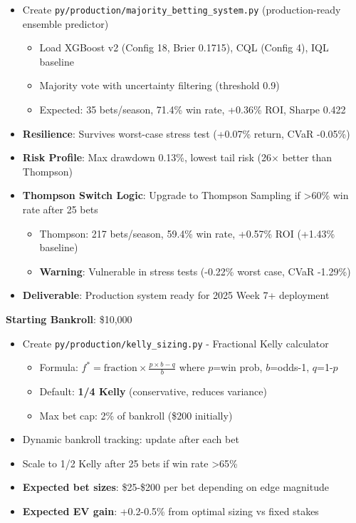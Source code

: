 \begin{itemize}
  \item {} Create \texttt{py/production/majority\_betting\_system.py} (production-ready ensemble predictor)
  \begin{itemize}
    \item Load XGBoost v2 (Config 18, Brier 0.1715), CQL (Config 4), IQL baseline
    \item Majority vote with uncertainty filtering (threshold 0.9)
    \item Expected: 35 bets/season, 71.4\% win rate, +0.36\% ROI, Sharpe 0.422
  \end{itemize}
  \item {} \textbf{Resilience}: Survives worst-case stress test (+0.07\% return, CVaR -0.05\%)
  \item {} \textbf{Risk Profile}: Max drawdown 0.13\%, lowest tail risk (26$\times$ better than Thompson)
  \item {} \textbf{Thompson Switch Logic}: Upgrade to Thompson Sampling if >60\% win rate after 25 bets
  \begin{itemize}
    \item Thompson: 217 bets/season, 59.4\% win rate, +0.57\% ROI (+1.43\% baseline)
    \item \textbf{Warning}: Vulnerable in stress tests (-0.22\% worst case, CVaR -1.29\%)
  \end{itemize}
  \item \textbf{Deliverable}: Production system ready for 2025 Week 7+ deployment
\end{itemize}

\textbf{Starting Bankroll}: \$10,000

\begin{itemize}
  \item {} Create \texttt{py/production/kelly\_sizing.py} - Fractional Kelly calculator
  \begin{itemize}
    \item Formula: $f^* = \text{fraction} \times \frac{p \times b - q}{b}$ where $p$=win prob, $b$=odds-1, $q$=1-$p$
    \item Default: \textbf{1/4 Kelly} (conservative, reduces variance)
    \item Max bet cap: 2\% of bankroll (\$200 initially)
  \end{itemize}
  \item {} Dynamic bankroll tracking: update after each bet
  \item {} Scale to 1/2 Kelly after 25 bets if win rate >65\%
  \item \textbf{Expected bet sizes}: \$25-\$200 per bet depending on edge magnitude
  \item \textbf{Expected EV gain}: +0.2-0.5\% from optimal sizing vs fixed stakes
\end{itemize}

